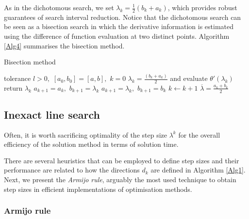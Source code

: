 As in the dichotomous search, we set $\lambda_k = \frac{1}{2}(b_k + a_k)$, which provides robust guarantees of search interval reduction. Notice that the dichotomous search can be seen as a bisection search in which the derivative information is estimated using the difference of function evaluation at two distinct points. Algorithm \ref{Alg4} summarises the bisection method.

\begin{algorithm}[h]
\caption{Bisection method} \label{Alg4}
\begin{algorithmic}[1] %
 tolerance $l > 0,$ $[a_0,b_0] = [a,b],$ $k = 0$ 
    \State $\lambda_k = \frac{(b_k + a_k)}{2}$ and evaluate $\theta'(\lambda_k)$
     return $\lambda_k$
        \State $a_{k+1} = a_k,$ $b_{k+1} = \lambda_k$
    \Else
        \State $a_{k+1} = \lambda_k,$ $b_{k+1} = b_k$   
    \EndIf 
\State $k \gets k+1$
\EndWhile
{} $\overline{\lambda} = \frac{a_k + b_k}{2}$
\end{algorithmic}
\end{algorithm}


\subsection{Inexact line search}

Often, it is worth sacrificing optimality of the step size $\lambda^k$ for the overall efficiency of the solution method in terms of solution time. 

There are several heuristics that can be employed to define step sizes and their performance are related to how the directions $d_k$ are defined in Algorithm \ref{Alg1}. Next, we present the \emph{Armijo rule}, arguably the most used technique to obtain step sizes in efficient implementations of optimisation methods. 

\subsubsection{Armijo rule}

